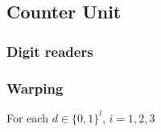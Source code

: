 \subsection{ Counter Unit }



    \subsubsection{ Digit readers }

    \subsubsection{ Warping }
        For each $d \in \{0, 1\}^l$, $i = 1, 2, 3$

